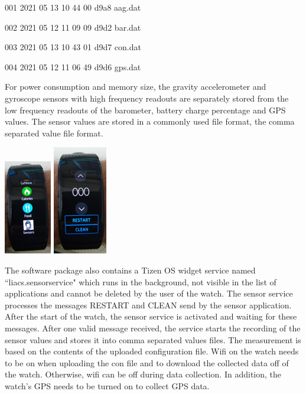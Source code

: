 \documentclass[12pt, a4paper]{article}
\begin{document}
001 2021 05 13 10 44 00 d9a8 aag.dat


002 2021 05 12 11 09 09 d9d2 bar.dat


003 2021 05 13 10 43 01 d9d7 con.dat


004 2021 05 12 11 06 49 d9d6 gps.dat

For power consumption and memory size, the gravity accelerometer and gyroscope sensors with high frequency readouts are separately stored from the low frequency readouts of the barometer, battery charge percentage and GPS values. The sensor values are stored in a commonly used file format, the comma separated value file format.

\begin{center}
    \includegraphics[width=.2\textwidth]{Pic 1.png}
    \includegraphics[width=.199\textwidth]{Pic 2.png}
\end{center}

The software package also contains a Tizen OS widget service named ``liacs.sensorservice" which runs in the background, not visible in the list of applications and cannot be deleted by the user of the watch. The sensor service processes the messages RESTART and CLEAN send by the sensor application. After the start of the watch, the sensor service is activated and waiting for these messages. After one valid message received, the service starts the recording of the sensor values and stores it into comma separated values files. The measurement is based on the contents of the uploaded configuration file. Wifi on the watch needs to be on when uploading the con file and to download the collected data off of the watch. Otherwise, wifi can be off during data collection. In addition, the watch's GPS needs to be turned on to collect GPS data.
\end{document}
